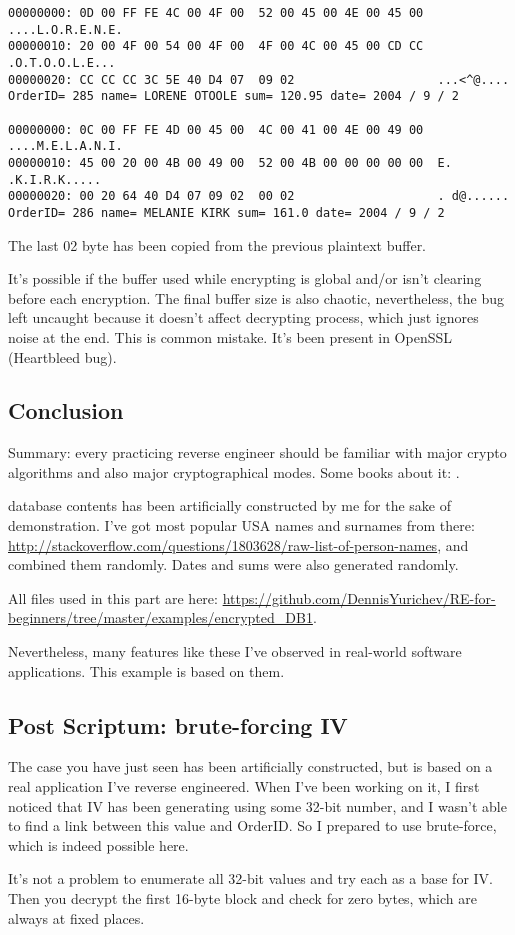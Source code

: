 \begin{lstlisting}
00000000: 0D 00 FF FE 4C 00 4F 00  52 00 45 00 4E 00 45 00  ....L.O.R.E.N.E.
00000010: 20 00 4F 00 54 00 4F 00  4F 00 4C 00 45 00 CD CC   .O.T.O.O.L.E...
00000020: CC CC CC 3C 5E 40 D4 07  09 02                    ...<^@....
OrderID= 285 name= LORENE OTOOLE sum= 120.95 date= 2004 / 9 / 2

00000000: 0C 00 FF FE 4D 00 45 00  4C 00 41 00 4E 00 49 00  ....M.E.L.A.N.I.
00000010: 45 00 20 00 4B 00 49 00  52 00 4B 00 00 00 00 00  E. .K.I.R.K.....
00000020: 00 20 64 40 D4 07 09 02  00 02                    . d@......
OrderID= 286 name= MELANIE KIRK sum= 161.0 date= 2004 / 9 / 2
\end{lstlisting}

The last 02 byte has been copied from the previous plaintext buffer.

It's possible if the buffer used while encrypting is global and/or isn't clearing before
each encryption.
The final buffer size is also chaotic, nevertheless, the bug left uncaught
because it doesn't affect decrypting process, which just ignores noise at the end.
This is common mistake.
It's been present in OpenSSL (Heartbleed bug).

\subsection{Conclusion}

Summary:
every practicing reverse engineer should be familiar with major crypto algorithms and
also major cryptographical modes.
Some books about it: .

 database contents has been artificially constructed by me for the sake of demonstration.
I've got most popular USA names and surnames from there: \url{http://stackoverflow.com/questions/1803628/raw-list-of-person-names},
and combined them randomly.
Dates and sums were also generated randomly.

All files used in this part are here: \url{https://github.com/DennisYurichev/RE-for-beginners/tree/master/examples/encrypted_DB1}.

Nevertheless, many features like these I've observed in real-world software applications.
This example is based on them.

\subsection{Post Scriptum: brute-forcing \ac{IV}}

The case you have just seen has been artificially constructed, but is based on a real application I've reverse engineered.
When I've been working on it, I first noticed that \ac{IV} has been generating using some 32-bit number,
and I wasn't able to find a link between this value and OrderID.
So I prepared to use brute-force, which is indeed possible here.

It's not a problem to enumerate all 32-bit values and try each as a base for \ac{IV}.
Then you decrypt the first 16-byte block and check for zero bytes, which are always at fixed places.
